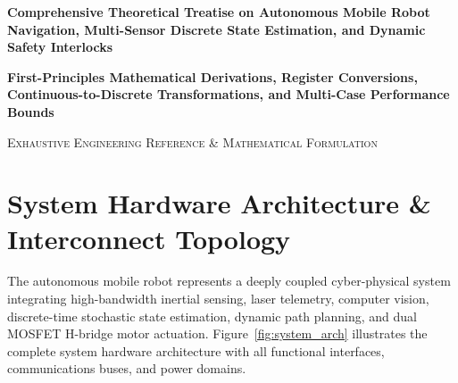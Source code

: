 \documentclass[11pt, a4paper]{article}
\begin{document}
\begin{titlepage}
    \centering
    \vspace*{\fill}
    {\huge \bfseries Comprehensive Theoretical Treatise on Autonomous Mobile Robot Navigation, Multi-Sensor Discrete State Estimation, and Dynamic Safety Interlocks \par}
    \vspace{1.5cm}
    {\Large \bfseries First-Principles Mathematical Derivations, Register Conversions, Continuous-to-Discrete Transformations, and Multi-Case Performance Bounds \par}
    \vspace{2.0cm}
    {\large \textsc{Exhaustive Engineering Reference \& Mathematical Formulation} \par}
    \vspace*{\fill}
\end{titlepage}

\newpage

\section{System Hardware Architecture \& Interconnect Topology}

The autonomous mobile robot represents a deeply coupled cyber-physical system integrating high-bandwidth inertial sensing, laser telemetry, computer vision, discrete-time stochastic state estimation, dynamic path planning, and dual MOSFET H-bridge motor actuation. Figure~\ref{fig:system_arch} illustrates the complete system hardware architecture with all functional interfaces, communications buses, and power domains.
\end{document}

